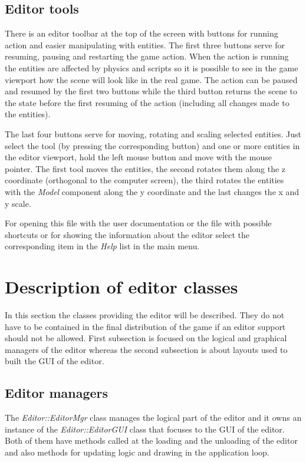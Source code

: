 \subsection{Editor tools}

There is an editor toolbar at the top of the screen with buttons for running action and easier manipulating with entities. The first three buttons serve for resuming, pausing and restarting the game action. When the action is running the entities are affected by physics and scripts so it is possible to see in the game viewport how the scene will look like in the real game. The action can be paused and resumed by the first two buttons while the third button returns the scene to the state before the first resuming of the action (including all changes made to the entities).

The last four buttons serve for moving, rotating and scaling selected entities. Just select the tool (by pressing the corresponding button) and one or more entities in the editor viewport, hold the left mouse button and move with the mouse pointer. The first tool moves the entities, the second rotates them along the z coordinate (orthogonal to the computer screen), the third rotates the entities with the \emph{Model} component along the y coordinate and the last changes the x and y scale.

For opening this file with the user documentation or the file with possible shortcuts or for showing the information about the editor select the corresponding item in the \emph{Help} list in the main menu.

\section{Description of editor classes}

In this section the classes providing the editor will be described. They do not have to be contained in the final distribution of the game if an editor support should not be allowed. First subsection is focused on the logical and graphical managers of the editor whereas the second subsection is about layouts used to built the GUI of the editor.

\subsection{Editor managers}

The \emph{Editor::EditorMgr} class manages the logical part of the editor and it owns an instance of the \emph{Editor::EditorGUI} class that focuses to the GUI of the editor. Both of them have methods called at the loading and the unloading of the editor and also methods for updating logic and drawing in the application loop.

